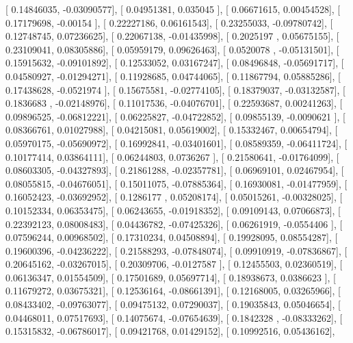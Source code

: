 \documentclass{article}
\begin{document}
       [ 0.14846035, -0.03090577],
       [ 0.04951381,  0.035045  ],
       [ 0.06671615,  0.00454528],
       [ 0.17179698, -0.00154   ],
       [ 0.22227186,  0.06161543],
       [ 0.23255033, -0.09780742],
       [ 0.12748745,  0.07236625],
       [ 0.22067138, -0.01435998],
       [ 0.2025197 ,  0.05675155],
       [ 0.23109041,  0.08305886],
       [ 0.05959179,  0.09626463],
       [ 0.0520078 , -0.05131501],
       [ 0.15915632, -0.09101892],
       [ 0.12533052,  0.03167247],
       [ 0.08496848, -0.05691717],
       [ 0.04580927, -0.01294271],
       [ 0.11928685,  0.04744065],
       [ 0.11867794,  0.05885286],
       [ 0.17438628, -0.0521974 ],
       [ 0.15675581, -0.02774105],
       [ 0.18379037, -0.03132587],
       [ 0.1836683 , -0.02148976],
       [ 0.11017536, -0.04076701],
       [ 0.22593687,  0.00241263],
       [ 0.09896525, -0.06812221],
       [ 0.06225827, -0.04722852],
       [ 0.09855139, -0.0090621 ],
       [ 0.08366761,  0.01027988],
       [ 0.04215081,  0.05619002],
       [ 0.15332467,  0.00654794],
       [ 0.05970175, -0.05690972],
       [ 0.16992841, -0.03401601],
       [ 0.08589359, -0.06411724],
       [ 0.10177414,  0.03864111],
       [ 0.06244803,  0.0736267 ],
       [ 0.21580641, -0.01764099],
       [ 0.08603305, -0.04327893],
       [ 0.21861288, -0.02357781],
       [ 0.06969101,  0.02467954],
       [ 0.08055815, -0.04676051],
       [ 0.15011075, -0.07885364],
       [ 0.16930081, -0.01477959],
       [ 0.16052423, -0.03692952],
       [ 0.1286177 ,  0.05208174],
       [ 0.05015261, -0.00328025],
       [ 0.10152334,  0.06353475],
       [ 0.06243655, -0.01918352],
       [ 0.09109143,  0.07066873],
       [ 0.22392123,  0.08008483],
       [ 0.04436782, -0.07425326],
       [ 0.06261919, -0.0554406 ],
       [ 0.07596244,  0.00968502],
       [ 0.17310234,  0.04508894],
       [ 0.19928095,  0.08554287],
       [ 0.19600396, -0.04236222],
       [ 0.21588293, -0.07848074],
       [ 0.09910919, -0.07836867],
       [ 0.20645162, -0.03267015],
       [ 0.20309706, -0.0127587 ],
       [ 0.12455503,  0.02360519],
       [ 0.06136347,  0.01554509],
       [ 0.17501689,  0.05697714],
       [ 0.18938673,  0.0386623 ],
       [ 0.11679272,  0.03675321],
       [ 0.12536164, -0.08661391],
       [ 0.12168005,  0.03265966],
       [ 0.08433402, -0.09763077],
       [ 0.09475132,  0.07290037],
       [ 0.19035843,  0.05046654],
       [ 0.04468011,  0.07517693],
       [ 0.14075674, -0.07654639],
       [ 0.1842328 , -0.08333262],
       [ 0.15315832, -0.06786017],
       [ 0.09421768,  0.01429152],
       [ 0.10992516,  0.05436162],
\end{document}
